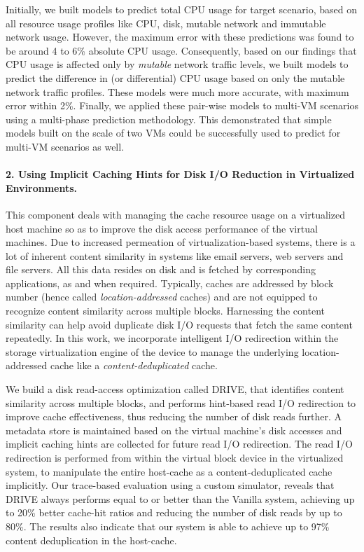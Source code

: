 Initially, we built models to predict total CPU usage for target scenario,
based on all resource usage profiles like CPU, disk, mutable network
and immutable network usage. However, the maximum error with these 
predictions was found to be around 4 to 6\% absolute CPU usage. 
Consequently, based on our findings that CPU usage is affected only by
\textit{mutable} network traffic levels, we built models to 
predict the difference in (or differential) CPU usage based on only
the mutable network traffic profiles. These models were much more
accurate, with maximum error within 2\%. Finally, we applied these
pair-wise models to multi-VM scenarios using a multi-phase
prediction methodology. This demonstrated that simple models
built on the scale of two VMs could be successfully used to
predict for multi-VM scenarios as well.

\paragraph{2. Using Implicit Caching Hints for {D}isk I/O {R}eduction in Virtualized Environments.}
This component deals with managing the cache resource
usage on a virtualized host machine so as to improve the disk access performance 
of the virtual machines.
Due to increased permeation of virtualization-based systems, there is a lot of 
inherent content similarity in systems like email servers, web servers 
and file servers. All this data resides on disk and is fetched by corresponding
applications, as and when required. 
Typically, caches are addressed by block number (hence called 
\textit{location-addressed} caches) and are not
equipped to recognize content similarity across multiple blocks.
Harnessing the content similarity can help 
avoid duplicate disk I/O requests that fetch the same content repeatedly.
In this work, we incorporate intelligent I/O redirection within the 
storage virtualization engine of the device to manage the underlying 
location-addressed cache like a \textit{content-deduplicated} cache.

We build a disk read-access optimization called DRIVE, that
identifies content similarity across multiple blocks, and performs
hint-based read I/O redirection to improve cache effectiveness,
thus reducing the number of disk reads further.
A metadata store is maintained based on the virtual machine's disk
accesses and implicit caching hints are collected
for future read I/O redirection.
The read I/O redirection is performed from within the virtual
block device in the virtualized system, to manipulate the entire
host-cache as a content-deduplicated cache implicitly.
Our trace-based evaluation using a custom simulator, 
reveals that
DRIVE always performs equal to or better than the Vanilla system,
achieving up to 20\% better cache-hit ratios and reducing the
number of disk reads by up to 80\%. The results also indicate that
our system is able to achieve up to 97\% content 
deduplication in the host-cache.


